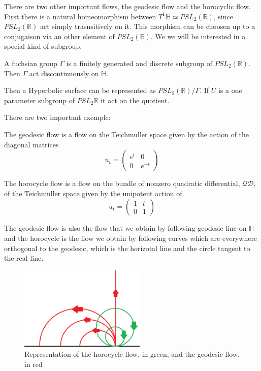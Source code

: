 There are two other important flows, the geodesic flow and the horocyclic flow.
First there is a natural homeomorphism between $T^1 \mathbb{H}  \simeq PSL_2(\mathbb{R})$, since $PSL_2(\mathbb{R})$ act simply trasnsitively on it. This morphism can be choosen up to a conjugaison via an other element of $PSL_2(\mathbb{R})$. We we will be interested in a special kind of subgroup.

\begin{dfnt}
A fuchsian group $\Gamma$ is a finitely generated and discrete subgroup of $PSL_2(\mathbb{R})$. Then $\Gamma$ act discontinuously on $\mathbb{H}$.
\end{dfnt}

Then a Hyperbolic surface can be represented as $PSL_2(\mathbb{R})/ \Gamma$. If $U$ is a one parameter subgroup of $PSL_2{\mathbb{R}}$ it act on the quotient.

There are two important exemple:

\begin{dfnt}
The geodesic flow is a flow on the Teichmuller space given by the action of the diagonal matrices\[
u_t=\begin{pmatrix}
e^t & 0 \\
0 & e^{-t}
\end{pmatrix}
\]
\end{dfnt}

\begin{dfnt}
The horocycle flow is a flow on the bundle of nonzero quadratic differential, $\mathcal{QD}$, of the Teichmuller space given by the unipotent action of \[
u_t=\begin{pmatrix}
1 & t \\
0 & 1
\end{pmatrix}
\]
\end{dfnt}

The geodesic flow is also the flow that we obtain by following geodesic line on $\mathbb{H}$ and the horocycle is the flow we obtain by following curves which are everywhere orthogonal to the geodesic, which is the horizotal line and the circle tangent to the real line.

\begin{figure}[h!]
\centering
\includegraphics[width=6cm]{Image/FlowPaint.png}
\caption{Representation of the horocycle flow, in green, and the geodesic flow, in red}
\end{figure}


